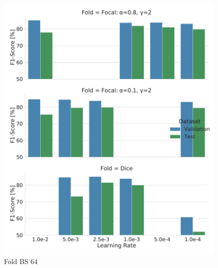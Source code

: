 \begin{figure}[H]
\begin{center}
    \includegraphics[width=\columnwidth]{imgs/munet_folds_bs64.pdf}
    \caption{Fold BS 64}
    \label{fig:munet_fold_64}
\end{center}
\end{figure}
